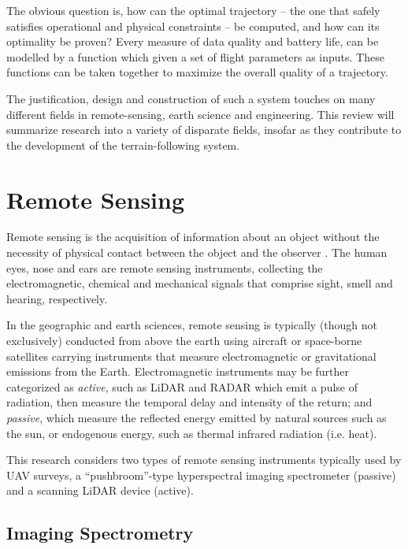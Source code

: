 \documentclass[10pt]{article}
\begin{document}
The obvious question is, how can the optimal trajectory -- the one that safely satisfies operational and physical constraints -- be computed, and how can its optimality be proven? Every measure of data quality and battery life, can be modelled by a function which given a set of flight parameters as inputs. These functions can be taken together to maximize the overall quality of a trajectory.

The justification, design and construction of such a system touches on many different fields in remote-sensing, earth science and engineering. This review will summarize research into a variety of disparate fields, insofar as they contribute to the development of the terrain-following system.


\section{Remote Sensing}

Remote sensing is the acquisition of information about an object without the necessity of physical contact between the object and the observer \cite{Gupta2018}. The human eyes, nose and ears are remote sensing instruments, collecting the electromagnetic, chemical and mechanical signals that comprise sight, smell and hearing, respectively.

In the geographic and earth sciences, remote sensing is typically (though not exclusively) conducted from above the earth using aircraft or space-borne satellites carrying instruments that measure electromagnetic or gravitational emissions from the Earth. Electromagnetic instruments may be further categorized as \emph{active}, such as LiDAR and RADAR which emit a pulse of radiation, then measure the temporal delay and intensity of the return; and \emph{passive}, which measure the reflected energy emitted by natural sources such as the sun, or endogenous energy, such as thermal infrared radiation (i.e. heat).

This research considers two types of remote sensing instruments typically used by UAV surveys, a ``pushbroom''-type hyperspectral imaging spectrometer (passive) and a scanning LiDAR device (active). 

\subsection{Imaging Spectrometry}
\end{document}
